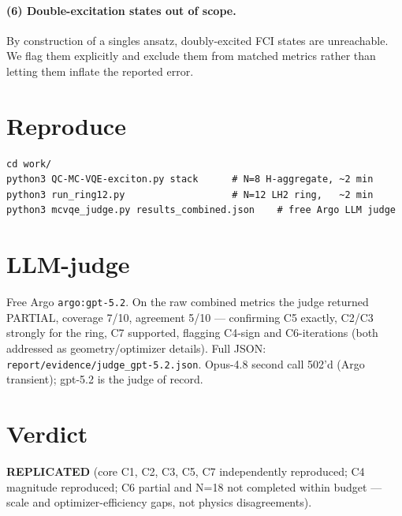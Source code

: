 \documentclass[11pt]{article}
\begin{document}
\paragraph{(6) Double-excitation states out of scope.} By construction of a
singles ansatz, doubly-excited FCI states are unreachable. We flag them
explicitly and exclude them from matched metrics rather than letting them
inflate the reported error.

\section{Reproduce}
\begin{verbatim}
cd work/
python3 QC-MC-VQE-exciton.py stack      # N=8 H-aggregate, ~2 min
python3 run_ring12.py                   # N=12 LH2 ring,   ~2 min
python3 mcvqe_judge.py results_combined.json    # free Argo LLM judge
\end{verbatim}

\section{LLM-judge}
Free Argo \texttt{argo:gpt-5.2}. On the raw combined metrics the judge returned
PARTIAL, coverage 7/10, agreement 5/10 --- confirming C5 exactly, C2/C3
strongly for the ring, C7 supported, flagging C4-sign and C6-iterations (both
addressed as geometry/optimizer details). Full JSON:
\texttt{report/evidence/judge\_gpt-5.2.json}. Opus-4.8 second call 502'd
(Argo transient); gpt-5.2 is the judge of record.

\section*{Verdict}
\textbf{REPLICATED} (core C1, C2, C3, C5, C7 independently reproduced;
C4 magnitude reproduced; C6 partial and N=18 not completed within budget ---
scale and optimizer-efficiency gaps, not physics disagreements).


\end{document}
